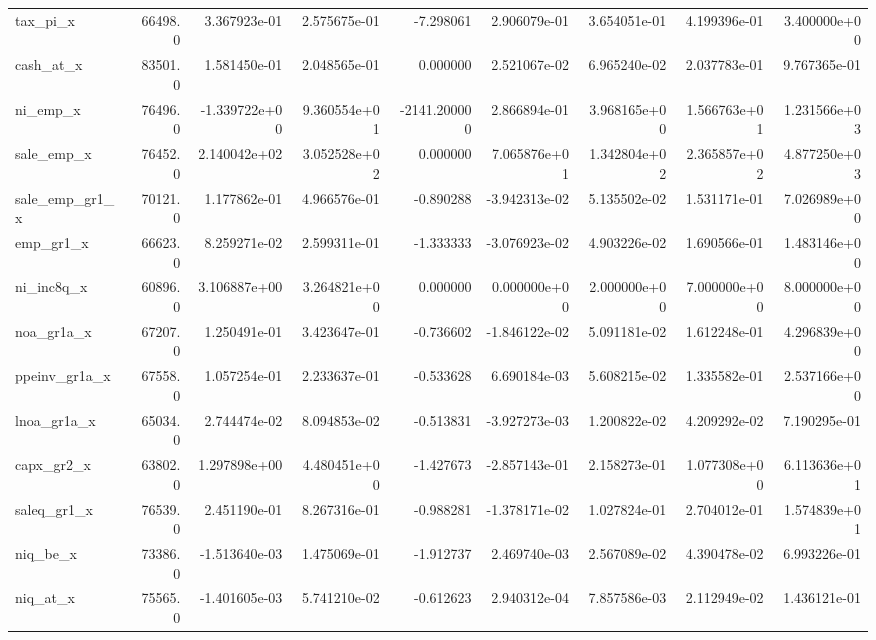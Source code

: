 \documentclass[10pt]{article}
\begin{document}
\begin{landscape}
\begin{longtable}{lrrrrrrrr}
tax\_pi\_x                &   66498.0 &  3.367923e-01 &  2.575675e-01 &     -7.298061 &  2.906079e-01 &  3.654051e-01 &  4.199396e-01 &  3.400000e+00 \\
cash\_at\_x               &   83501.0 &  1.581450e-01 &  2.048565e-01 &      0.000000 &  2.521067e-02 &  6.965240e-02 &  2.037783e-01 &  9.767365e-01 \\
ni\_emp\_x                &   76496.0 & -1.339722e+00 &  9.360554e+01 &  -2141.200000 &  2.866894e-01 &  3.968165e+00 &  1.566763e+01 &  1.231566e+03 \\
sale\_emp\_x              &   76452.0 &  2.140042e+02 &  3.052528e+02 &      0.000000 &  7.065876e+01 &  1.342804e+02 &  2.365857e+02 &  4.877250e+03 \\
sale\_emp\_gr1\_x          &   70121.0 &  1.177862e-01 &  4.966576e-01 &     -0.890288 & -3.942313e-02 &  5.135502e-02 &  1.531171e-01 &  7.026989e+00 \\
emp\_gr1\_x               &   66623.0 &  8.259271e-02 &  2.599311e-01 &     -1.333333 & -3.076923e-02 &  4.903226e-02 &  1.690566e-01 &  1.483146e+00 \\
ni\_inc8q\_x              &   60896.0 &  3.106887e+00 &  3.264821e+00 &      0.000000 &  0.000000e+00 &  2.000000e+00 &  7.000000e+00 &  8.000000e+00 \\
noa\_gr1a\_x              &   67207.0 &  1.250491e-01 &  3.423647e-01 &     -0.736602 & -1.846122e-02 &  5.091181e-02 &  1.612248e-01 &  4.296839e+00 \\
ppeinv\_gr1a\_x           &   67558.0 &  1.057254e-01 &  2.233637e-01 &     -0.533628 &  6.690184e-03 &  5.608215e-02 &  1.335582e-01 &  2.537166e+00 \\
lnoa\_gr1a\_x             &   65034.0 &  2.744474e-02 &  8.094853e-02 &     -0.513831 & -3.927273e-03 &  1.200822e-02 &  4.209292e-02 &  7.190295e-01 \\
capx\_gr2\_x              &   63802.0 &  1.297898e+00 &  4.480451e+00 &     -1.427673 & -2.857143e-01 &  2.158273e-01 &  1.077308e+00 &  6.113636e+01 \\
saleq\_gr1\_x             &   76539.0 &  2.451190e-01 &  8.267316e-01 &     -0.988281 & -1.378171e-02 &  1.027824e-01 &  2.704012e-01 &  1.574839e+01 \\
niq\_be\_x                &   73386.0 & -1.513640e-03 &  1.475069e-01 &     -1.912737 &  2.469740e-03 &  2.567089e-02 &  4.390478e-02 &  6.993226e-01 \\
niq\_at\_x                &   75565.0 & -1.401605e-03 &  5.741210e-02 &     -0.612623 &  2.940312e-04 &  7.857586e-03 &  2.112949e-02 &  1.436121e-01 \\

\end{longtable}
\end{landscape}
\end{document}

